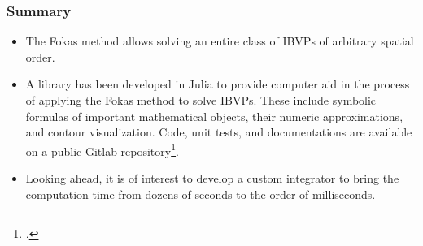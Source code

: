 \documentclass{beamer}
\begin{document}
\begin{frame}
    \frametitle{Summary}
    \begin{itemize}
        \item The Fokas method allows solving an entire class of IBVPs of arbitrary spatial order.
        \item A library has been developed in Julia to provide computer aid in the process of applying the Fokas method to solve IBVPs. These include symbolic formulas of important mathematical objects, their numeric approximations, and contour visualization. Code, unit tests, and documentations are available on a public Gitlab repository\footcite{Xiao}.
        \item Looking ahead, it is of interest to develop a custom integrator to bring the computation time from dozens of seconds to the order of milliseconds.
    \end{itemize}
\end{frame}

% 
% 


\end{document}

